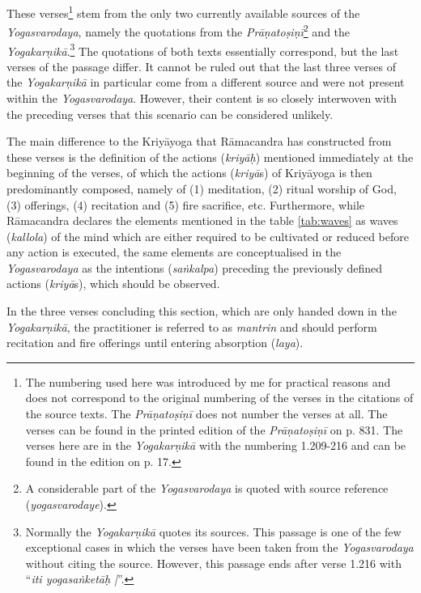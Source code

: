 These verses\footnote{The numbering used here was introduced by me for practical reasons and does not correspond to the original numbering of the verses in the citations of the source texts. The \textit{Prāṇatoṣiṇī} does not number the verses at all. The verses can be found in the printed edition of the \textit{Prāṇatoṣiṇī} on p. 831. The verses here are in the \textit{Yogakarṇikā} with the numbering 1.209-216 and can be found in the edition on p. 17.} stem from the only two currently available sources of the \textit{Yogasvarodaya}, namely the quotations from the \textit{Prāṇatoṣiṇī}\footnote{A considerable part of the \textit{Yogasvarodaya} is quoted with source reference (\textit{yogasvarodaye}).} and the \textit{Yogakarṇikā}.\footnote{Normally the \textit{Yogakarṇikā} quotes its sources. This passage is one of the few exceptional cases in which the verses have been taken from the \textit{Yogasvarodaya} without citing the source. However, this passage ends after verse 1.216 with ``\textit{iti yogasaṅketāḥ |}''.} The quotations of both texts essentially correspond, but the last verses of the passage differ. It cannot be ruled out that the last three verses of the \textit{Yogakarṇikā} in particular come from a different source and were not present within the \textit{Yogasvarodaya}. However, their content is so closely interwoven with the preceding verses that this scenario can be considered unlikely.

The main difference to the Kriyāyoga that Rāmacandra has constructed from these verses is the definition of the actions (\textit{kriyāḥ}) mentioned immediately at the beginning of the verses, of which the actions (\textit{kriyā}s) of Kriyāyoga is then predominantly composed, namely of (1) meditation, (2) ritual worship of God, (3) offerings, (4) recitation and (5) fire sacrifice, etc. Furthermore, while Rāmacandra declares the elements mentioned in the table \ref{tab:waves} as waves (\textit{kallola}) of the mind which are either required to be cultivated or reduced before any action is executed, the same elements are conceptualised in the \textit{Yogasvarodaya} as the intentions (\textit{saṅkalpa}) preceding the previously defined actions (\textit{kriyā}s), which should be observed.

In the three verses concluding this section, which are only handed down in the \textit{Yogakarṇikā}, the practitioner is referred to as \textit{mantrin} and should perform recitation and fire offerings until entering absorption (\textit{laya}).

